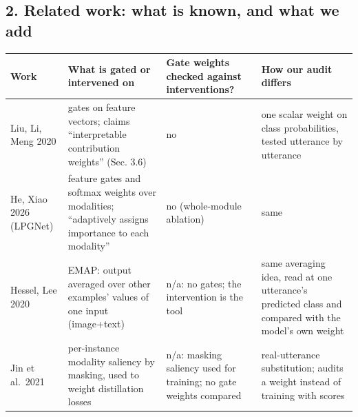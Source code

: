 \documentclass[
  10pt,
]{article}
\newcounter{none} %
\begin{document}
\subsection{2. Related work: what is known, and what we
add}\label{related-work-what-is-known-and-what-we-add}

{\def\LTcaptype{none} %
\begin{longtable}[]{@{}
  >{\raggedright\arraybackslash}p{}
  >{\raggedright\arraybackslash}p{}
  >{\raggedright\arraybackslash}p{}
  >{\raggedright\arraybackslash}p{}@{}}
\toprule\noalign{}
\begin{minipage}[b]{\linewidth}\raggedright
Work
\end{minipage} & \begin{minipage}[b]{\linewidth}\raggedright
What is gated or intervened on
\end{minipage} & \begin{minipage}[b]{\linewidth}\raggedright
Gate weights checked against interventions?
\end{minipage} & \begin{minipage}[b]{\linewidth}\raggedright
How our audit differs
\end{minipage} \\
\midrule\noalign{}
\endhead
\bottomrule\noalign{}
\endlastfoot
Liu, Li, Meng 2020 & gates on feature vectors; claims ``interpretable
contribution weights'' (Sec. 3.6) & no & one scalar weight on class
probabilities, tested utterance by utterance \\
He, Xiao 2026 (LPGNet) & feature gates and softmax weights over
modalities; ``adaptively assigns importance to each modality'' & no
(whole-module ablation) & same \\
Hessel, Lee 2020 & EMAP: output averaged over other examples' values of
one input (image+text) & n/a: no gates; the intervention is the tool &
same averaging idea, read at one utterance's predicted class and
compared with the model's own weight \\
Jin et al.~2021 & per-instance modality saliency by masking, used to
weight distillation losses & n/a: masking saliency used for training; no
gate weights compared & real-utterance substitution; audits a weight
instead of training with scores \\
\end{longtable}
}
\end{document}
